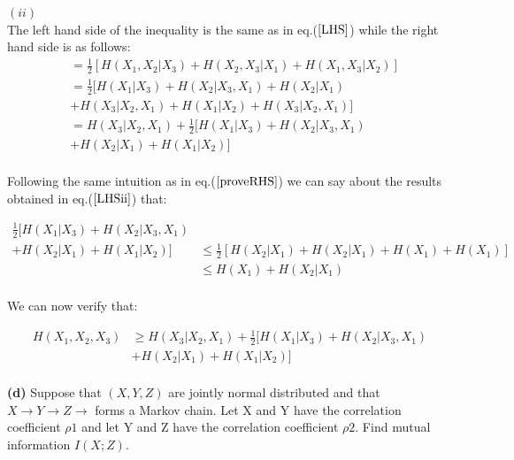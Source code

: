 \documentclass[11pt]{article}
\makeatletter
\newenvironment{proofw}{\par
	\pushQED{\qed}%
	\normalfont \topsep6\p@\@plus6\p@\relax
	\trivlist
	\item[]\ignorespaces
}{%
	\popQED\endtrivlist\@endpefalse
}
\makeatother
\begin{document}
\begin{proofw}
	$(ii)$\\
	
The left hand side of the inequality is the same as in eq.($\ref{LHS}$) while the right hand side is as follows:
\begin{equation}\label{LHSii}
\begin{split}
 &= \frac{1}{2} [H(X_{1},X_{2}|X_{3})+H(X_{2},X_{3}|X_{1})+H(X_{1},X_{3}|X_{2})]\\
& = \frac{1}{2}[H(X_{1}|X_{3})+H(X_{2}|X_{3},X_{1})+H(X_{2}|X_{1})
\\&+H(X_{3}|X_{2},X_{1})+H(X_{1}|X_{2})+H(X_{3}|X_{2},X_{1})]\\
& = H(X_{3}|X_{2},X_{1}) + \frac{1}{2} [H(X_{1}|X_{3})+H(X_{2}|X_{3},X_{1})\\
&+H(X_{2}|X_{1})+H(X_{1}|X_{2})]\\
\end{split}
\end{equation}	

Following the same intuition as in eq.($\ref{proveRHS}$) we can say about the results obtained in eq.($\ref{LHSii}$) that:

\begin{equation*}
\begin{split}
\frac{1}{2} [H(X_{1}|X_{3})+H(X_{2}|X_{3},X_{1})\\+H(X_{2}|X_{1})+H(X_{1}|X_{2})] &\leq \frac{1}{2}[H(X_{2}|X_{1})+H(X_{2}|X_{1}) + H(X_{1}) + H(X_{1})]\\
& \leq H(X_{1}) + H(X_{2}|X_{1})\\
\end{split}
\end{equation*}	

We can now verify that:

\begin{equation*}
\begin{split}
H(X_{1},X_{2},X_{3}) &\geq H(X_{3}|X_{2},X_{1}) + \frac{1}{2} [H(X_{1}|X_{3})+H(X_{2}|X_{3},X_{1}) \\&+H(X_{2}|X_{1})+H(X_{1}|X_{2})]\\
\end{split}
\end{equation*}	
\end{proofw}
\pagebreak
\begin{tcolorbox}
\textbf{(d)}
Suppose that $(X ,Y ,Z)$ are jointly normal distributed and that
$X \rightarrow Y \rightarrow Z \rightarrow$ forms a Markov chain. Let X and Y have the correlation coefficient $\rho1$ and let Y and Z have the correlation coefficient $\rho2$. Find mutual information $I(X;Z)$.
\end{tcolorbox}
\end{document}
